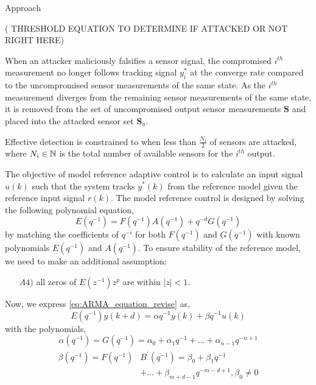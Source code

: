 \begin{section}{Approach}

( THRESHOLD EQUATION TO DETERMINE IF ATTACKED OR NOT RIGHT HERE)

When an attacker maliciously falsifies a sensor signal, the compromised $i^{th}$ measurement no longer follows tracking signal $y_i^*$ at the converge rate compared to the uncompromised sensor measurements of the same state. As the $i^{th}$ measurement diverges from the remaining sensor measurements of the same state, it is removed from the set of uncompromised output sensor measurements $\bm{S}$ and placed into the attacked sensor set $\bm{S}_a$.




Effective detection is constrained to when less than $\frac{N_i}{2}$ of sensors are attacked, where $N_i \in \mathbb{N}$ is the total number of available sensors for the $i^{th}$ output.

	
	
	
	
	
	
	
	
The objective of model reference adaptive control is to calculate an input signal $u(k)$ such that the system tracks $y^{*}(k)$ from the reference model given the reference input signal $r(k)$. The model reference control is designed by solving the following polynomial equation,
    \begin{equation}
	E(q^{-1})=F(q^{-1})A(q^{-1})+q^{-d}G(q^{-1})
	\end{equation}
by matching the coefficients of $q^{-i}$ for both $F(q^{-1})$ and $G(q^{-1})$ with  known polynomials $E(q^{-1})$ and $A(q^{-1})$.
To ensure stability of the reference model, we need to make an additional assumption:
    \begin{enumerate}[leftmargin=4\parindent]
	\item[$A4)$] all zeros of $E(z^{-1})z^p$ are within $|z|<1$. 
	\end{enumerate}	
Now, we express \eqref{eq:ARMA_equation_revise} as,
	\begin{equation}
	\label{eq:ARMA_equation_revise2}
	E(q^{-1})y(k+d)={\alpha}q^{-1}y(k) + {\beta}q^{-1}u(k)
	\end{equation}
with the polynomials,
	\begin{equation}
	\alpha(q^{-1})=G(q^{-1})=\alpha_0+\alpha_1q^{-1}+ \dots +\alpha_{n-1}q^{-n+1}
	\end{equation}
	\begin{align}
	\begin{split}
	\beta( q^{-1})= F(q^{-1})&B^{'}(q^{-1})=\beta_0+\beta_1q^{-1} \\
	& + \dots +\beta_{m+d-1}q^{-m-d+1}, \beta_0\neq0
	\end{split}
	\end{align}


\end{section}
